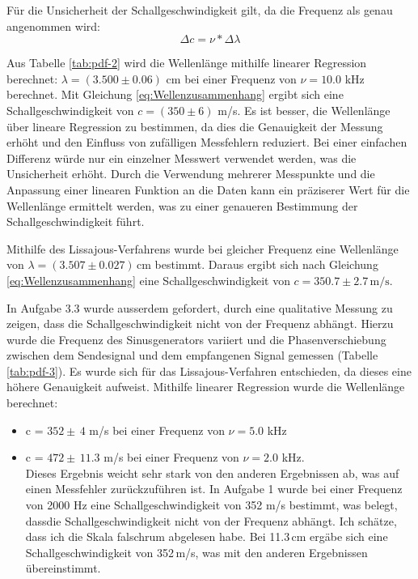 \documentclass[12pt,a4paper,titlepage]{scrartcl}
\numberwithin{equation}{section}
\numberwithin{table}{section}
\numberwithin{figure}{section}
\begin{document}
Für die Unsicherheit der Schallgeschwindigkeit gilt, da die Frequenz als genau angenommen wird:
\begin{equation}
    \Delta c = \nu * \Delta \lambda
\end{equation}

Aus Tabelle \ref{tab:pdf-2} wird die Wellenlänge mithilfe linearer Regression berechnet: $\lambda = (3.500\pm 0.06)$ cm bei einer Frequenz von $\nu = 10.0$ kHz berechnet. Mit Gleichung \ref{eq:Wellenzusammenhang} ergibt sich eine Schallgeschwindigkeit von $c = (350\pm 6)$ m/s. Es ist besser, die Wellenlänge über lineare Regression zu bestimmen, da dies die Genauigkeit der Messung erhöht und den Einfluss von zufälligen Messfehlern reduziert. Bei einer einfachen Differenz würde nur ein einzelner Messwert verwendet werden, was die Unsicherheit erhöht. Durch die Verwendung mehrerer Messpunkte und die Anpassung einer linearen Funktion an die Daten kann ein präziserer Wert für die Wellenlänge ermittelt werden, was zu einer genaueren Bestimmung der Schallgeschwindigkeit führt.

\medskip
Mithilfe des Lissajous-Verfahrens wurde bei gleicher Frequenz eine Wellenlänge von $\lambda = (3.507\pm 0.027)\,\text{cm}$ bestimmt.
Daraus ergibt sich nach Gleichung \ref{eq:Wellenzusammenhang} eine Schallgeschwindigkeit von $c = 350.7\pm 2.7\,\text{m/s}$.


In Aufgabe 3.3 wurde ausserdem gefordert, durch eine qualitative Messung zu zeigen, dass die Schallgeschwindigkeit nicht von der Frequenz abhängt. Hierzu wurde die Frequenz des Sinusgenerators variiert und die Phasenverschiebung zwischen dem Sendesignal und dem empfangenen Signal gemessen (Tabelle \ref{tab:pdf-3}).
Es wurde sich für das Lissajous-Verfahren entschieden, da dieses eine höhere Genauigkeit aufweist. Mithilfe linearer Regression wurde die Wellenlänge berechnet: 
\begin{itemize}
    \item c = $352\pm\,4$ m/s bei einer Frequenz von $\nu = 5.0$ kHz
    \item c = $472\pm\,11.3$ m/s bei einer Frequenz von $\nu = 2.0$ kHz.\\
    Dieses Ergebnis weicht sehr stark von den anderen Ergebnissen ab, was auf einen Messfehler zurückzuführen ist. In Aufgabe 1 wurde bei einer Frequenz von 2000 Hz eine Schallgeschwindigkeit von 352 m/s bestimmt, was belegt, dassdie Schallgeschwindigkeit nicht von der Frequenz abhängt. Ich schätze, dass ich die Skala falschrum abgelesen habe. Bei 11.3\,cm ergäbe sich eine Schallgeschwindigkeit von 352\,m/s, was mit den anderen Ergebnissen übereinstimmt.
\end{itemize}
\end{document}
